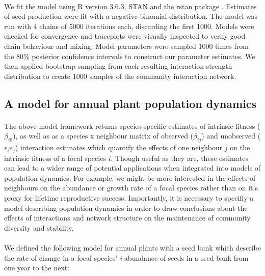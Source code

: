 \documentclass[a4,12pt]{article}
\begin{document}
\begin{itemize}
        \paragraph{}
        We fit the model using R version 3.6.3, STAN and the rstan package \parencite{R2020, Carpenter2017, Rstan2020}. Estimates of seed production were fit with a negative binomial distribution. The model was run with 4 chains of 5000 iterations each, discarding the first 1000. Models were checked for convergence and traceplots were visually inspected to verify good chain behaviour and mixing. Model parameters were sampled 1000 times from the 80\% posterior confidence intervals to construct our parameter estimates. We then applied bootstrap sampling from each resulting interaction strength distribution to create 1000 samples of the community interaction network.

        \subsection{A model for annual plant population dynamics}

        \paragraph{}
        The above model framework returns species-specific estimates of intrinsic fitness ($\beta_{i0}$), as well as as a species x neighbour matrix of observed ($\beta_{ij}$) and unobserved ($r_i e_j$) interaction estimates which quantify the effects of one neighbour $j$ on the intrinsic fitness of a focal species $i$. Though useful as they are, these estimates can lead to a wider range of potential applications when integrated into models of population dynamics. For example, we might be more interested in the effects of neighbours on the abundance or growth rate of a focal species rather than on it's proxy for lifetime reproductive success. Importantly, it is necessary to specifiy a model describing population dynamics in order to draw conclusions about the effects of interactions and network structure on the maintenance of community diversity and stability. 

        \paragraph{} 
        We defined the following model for annual plants with a seed bank \parencite{Levine2009, Mayfield2017, Bimler2018} which describe the rate of change in a focal species' \textit{i} abundance of seeds in a seed bank from one year to the next: 
    

\end{itemize}
\end{document}
